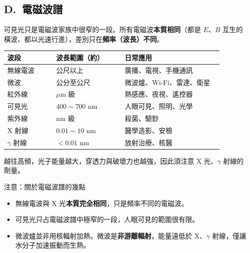 \documentclass[11pt]{article}
\begin{document}
\subsection*{\sffamily D.\ 電磁波譜}

可見光只是電磁波家族中很窄的一段。所有電磁波\textbf{本質相同}（都是 $E$、$B$ 互生的橫波、都以光速行進），差別只在\textbf{頻率（波長）不同}。


\begin{center}
\renewcommand{\arraystretch}{1.3}
\begin{tabular}{p{0.20\linewidth} p{0.28\linewidth} p{0.40\linewidth}}
\hline
\textbf{波段} & \textbf{波長範圍（約）} & \textbf{日常應用} \\
\hline
無線電波 & 公尺以上 & 廣播、電視、手機通訊 \\
微波 & 公分至公尺 & 微波爐、Wi-Fi、雷達、衛星 \\
紅外線 & $\mu$m 級 & 熱感應、夜視、遙控器 \\
可見光 & $400\sim700$ nm & 人眼可見、照明、光學 \\
紫外線 & nm 級 & 殺菌、驗鈔 \\
X 射線 & $0.01\sim10$ nm & 醫學造影、安檢 \\
$\gamma$ 射線 & $<0.01$ nm & 放射治療、核醫 \\
\hline
\end{tabular}
\end{center}

越往高頻，光子能量越大，穿透力與破壞力也越強，因此須注意 X 光、$\gamma$ 射線的劑量。

\begin{補充框}{注意：關於電磁波譜的幾點}
\begin{itemize}\setlength{\itemsep}{1pt}
\item 無線電波與 X 光\textbf{本質完全相同}，只是頻率不同的電磁波。
\item 可見光只占電磁波譜中極窄的一段，人眼可見的範圍很有限。
\item 微波爐並非用核輻射加熱。微波是\textbf{非游離輻射}，能量遠低於 X、$\gamma$ 射線，僅讓水分子加速振動而生熱。
\end{itemize}
\end{補充框}
\end{document}
